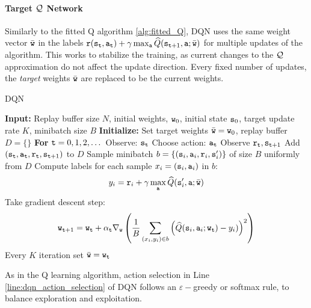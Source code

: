 \paragraph{Target $\mathcal{Q}$ Network} 
Similarly to the fitted Q algorithm \ref{alg:fitted_Q}, DQN uses the same weight vector $\bar{{\tt w}}$ in the labels ${\tt r}({\tt s}_{\tt t},{\tt a}_{\tt t}) + \gamma \max_{\tt a} \widehat{Q}({\tt s}_{{\tt t}+1},{\tt a};\bar{{\tt w}})$ for multiple updates of the algorithm. This works to stabilize the training, as current changes to the $\mathcal{Q}$ approximation do not affect the update direction. Every fixed number of updates, the \textit{target} weights $\bar{{\tt w}}$ are replaced to be the current weights.

\begin{algorithm}[H]
\caption{DQN}\label{alg:DQN}
\begin{algorithmic}[1]
\State \textbf{Input:} Replay buffer size $N$, initial weights, ${\tt w}_0$, initial state ${\tt s}_0$, target update rate $K$, minibatch size $B$
\State \textbf{Initialize:} Set target weights $\bar{{\tt w}} = {\tt w}_0$, replay buffer $D = \{ \}$
\State \textbf{For} {${\tt t} = 0, 1, 2, \dots$}
    \State \quad Observe: ${\tt s}_{\tt t}$ 
    \State \quad \label{line:dqn_action_selection}Choose action: ${\tt a}_{\tt t}$ 
    \State \quad Observe ${\tt r}_{\tt t}, {\tt s}_{{\tt t}+1}$
    \State \quad Add $\left({\tt s}_{\tt t},  {\tt a}_{\tt t}, {\tt r}_{\tt t}, {\tt s}_{{\tt t}+1}\right)$ to $D$
    \State \quad Sample minibatch $b = \left\{\left({\tt s}_i,  {\tt a}_i, {\tt r}_i, {\tt s}_{i}'\right)\right\}$ of size $B$ uniformly from $D$ 
    \State \quad Compute labels for each sample $x_i = ({\tt s}_i, {\tt a}_i)$ in $b$: 
\begin{align*}
y_i = {\tt r}_i + \gamma \max_{\tt a} \widehat{Q}({\tt s}_{i}', {\tt a};\bar{{\tt w}})
\end{align*}
    \State \quad Take gradient descent step:
    \begin{equation*}
    {\tt w}_{{\tt t}+1} = {\tt w}_{\tt t} + \alpha_{\tt t} \nabla_{{\tt w}} \left( \frac{1}{B}\sum_{(x_i,y_i)\in b} \left(\widehat{Q}({\tt s}_{i}, {\tt a}_{i};{\tt w}_{\tt t}) - y_i)\right)^2\right) 
\end{equation*}
\State \quad Every $K$ iteration set $\bar{{\tt w}} = {\tt w}_{\tt t}$
\end{algorithmic}
\end{algorithm}

As in the Q learning algorithm, action selection in Line \ref{line:dqn_action_selection} of DQN follows  an $\varepsilon-$greedy or softmax rule, to balance exploration and exploitation.

